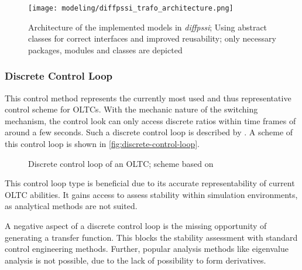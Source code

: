 \begin{figure}[htbp!]
        \centering
        \texttt{[image: modeling/diffpssi\_trafo\_architecture.png]}
        \caption[Architecture of the implemented models in \textit{diffpssi}]{Architecture of the implemented models in \textit{diffpssi}; Using abstract classes for correct interfaces and improved reusability; only necessary packages, modules and classes are depicted}
        \label{fig:transformer-architecture}
\end{figure}

\subsubsection{Discrete Control Loop}

This control method represents the currently most used and thus representative control scheme for \acsp{OLTC}. 
With the mechanic nature of the switching mechanism, the control look can only access discrete ratios within time frames of around a few seconds. 
Such a discrete control loop is described by \textcite{milano_2011,milano_2010}. 
A scheme of this control loop is shown in \autoref{fig:discrete-control-loop}.

\begin{figure}[htb!]
        \centering
        \caption{Discrete control loop of an \acs{OLTC}; scheme based on \textcite{milano_2011}}
        \label{fig:discrete-control-loop}
\end{figure}

This control loop type is beneficial due to its accurate representability of current \acs{OLTC} abilities. 
It gains access to assess stability within simulation environments, as analytical methods are not suited.

A negative aspect of a discrete control loop is the missing opportunity of generating a transfer function. 
This blocks the stability assessment with standard control engineering methods. 
Further, popular analysis methods like eigenvalue analysis is not possible, due to the lack of possibility to form derivatives.

